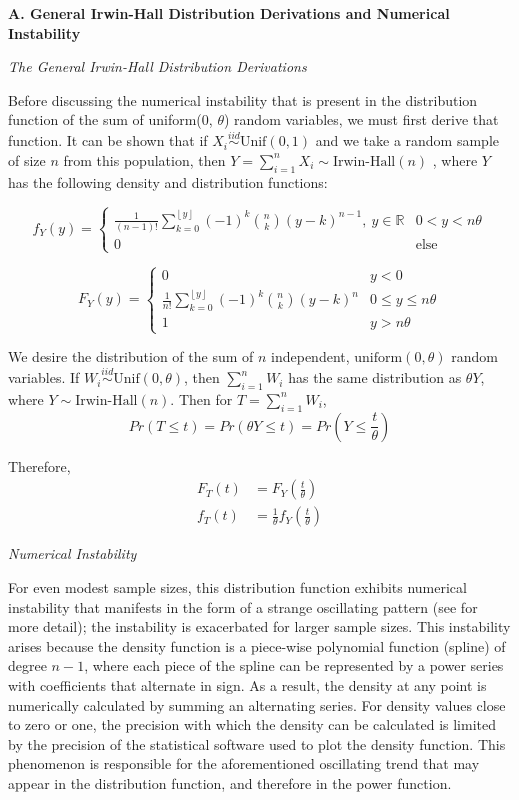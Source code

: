 \documentclass{TISE}
\begin{document}
\begin{center}
	\textbf{\large A. General Irwin-Hall Distribution Derivations and Numerical Instability}
\end{center}

\textit{The General Irwin-Hall Distribution Derivations}

Before discussing the numerical instability that is present in the distribution function of the sum of uniform($0$, $\theta$) random variables, we must first derive that function. It can be shown that if $X_i \stackrel{iid}{\sim} \text{Unif}(0, 1)$ and we take a random sample of size $n$ from this population, then $Y = \sum_{i=1}^n X_i \sim \text{Irwin-Hall}(n)$ \citep{marengo2017}, where $Y$ has the following density and distribution functions:

\[
f_Y(y) = \begin{cases}
\frac{1}{(n-1)!} \sum_{k = 0}^{\left \lfloor{y}\right \rfloor} (-1)^k \binom{n}{k}(y-k)^{n-1}, \ y \in \mathbb{R} & 0 < y < n\theta \\
0 & \text{else}
\end{cases} 
\]

\[
F_Y(y) = \begin{cases}
0 & y < 0 \\
\frac{1}{n!} \sum_{k = 0}^{\left \lfloor{y}\right \rfloor} (-1)^k \binom{n}{k}(y-k)^{n} & 0 \leq y \leq n\theta \\
1 & y > n\theta 
\end{cases}
\]

We desire the distribution of the sum of $n$ independent, $\text{uniform}(0, \theta)$ random variables. If $W_i \stackrel{iid}{\sim} \text{Unif}(0, \theta)$, then $\sum_{i=1}^n W_i$ has the same distribution as $\theta Y$, where $Y \sim \text{Irwin-Hall}(n)$. Then for $T = \sum_{i=1}^n W_i$, 
\[
Pr(T \leq t) = Pr(\theta Y \leq t) = Pr\left(Y \leq \frac{t}{\theta}\right)
\]

Therefore, 
\[
\begin{split}
F_T(t) &= F_Y\left(\frac{t}{\theta} \right) \\
f_T(t) &= \frac{1}{\theta} f_Y\left(\frac{t}{\theta}\right)
\end{split}
\]

\textit{Numerical Instability}

For even modest sample sizes, this distribution function exhibits numerical instability that manifests in the form of a strange oscillating pattern (see \citealt{alberto2019} for more detail); the instability is exacerbated for larger sample sizes. This instability arises because the density function is a piece-wise polynomial function (spline) of degree $n - 1$, where each piece of the spline can be represented by a power series with coefficients that alternate in sign. As a result, the density at any point is numerically calculated by summing an alternating series. For density values close to zero or one, the precision with which the density can be calculated is limited by the precision of the statistical software used to plot the density function. This phenomenon is responsible for the aforementioned oscillating trend that may appear in the distribution function, and therefore in the power function.
\end{document}
